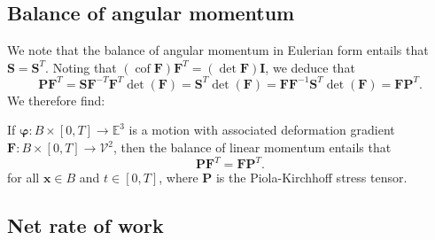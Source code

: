 \documentclass[
  letterpaper,
  DIV=11,
  numbers=noendperiod]{scrreprt}
\theoremstyle{plain}
\theoremstyle{remark}
\begin{document}
\subsection{Balance of angular
momentum}\label{balance-of-angular-momentum-1}

We note that the balance of angular momentum in Eulerian form entails
that \({\boldsymbol{S}}= {\boldsymbol{S}}^T\). Noting that
\(({\operatorname{cof}}{\boldsymbol{F}}){\boldsymbol{F}}^T = (\det{\boldsymbol{F}}){\boldsymbol{I}}\),
we deduce that
\[{\boldsymbol{P}}{\boldsymbol{F}}^T = {\boldsymbol{S}}{\boldsymbol{F}}^{-T}{\boldsymbol{F}}^T\det({\boldsymbol{F}}) = {\boldsymbol{S}}^T\det({\boldsymbol{F}}) = {\boldsymbol{F}}{\boldsymbol{F}}^{-1}{\boldsymbol{S}}^T\det({\boldsymbol{F}}) = {\boldsymbol{F}}{\boldsymbol{P}}^T.\]
We therefore find:

If \({\boldsymbol{\varphi}}:B\times[0,T]\to{\mathbb{E}}^3\) is a motion
with associated deformation gradient
\({\boldsymbol{F}}:B\times[0,T]\to{\mathcal{V}}^2\), then the balance of
linear momentum entails that
\[{\boldsymbol{P}}{\boldsymbol{F}}^T = {\boldsymbol{F}}{\boldsymbol{P}}^T.\]
for all \({\boldsymbol{x}}\in B\) and \(t\in[0,T]\), where
\({\boldsymbol{P}}\) is the Piola-Kirchhoff stress tensor.

\subsection{Net rate of work}\label{net-rate-of-work}
\end{document}
